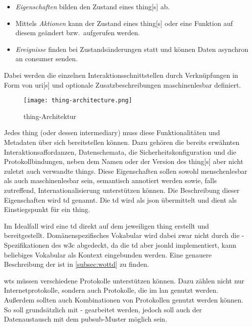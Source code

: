 \begin{itemize}
  \item \emph{Eigenschaften} bilden den Zustand eines \gls{thing}[s] ab.
  \item Mittels \emph{Aktionen} kann der Zustand eines \gls{thing}[s] oder eine Funktion auf diesem geändert bzw.\ aufgerufen werden. %
  \item \emph{Ereignisse} finden bei Zustandsänderungen statt und können Daten asynchron an \gls{consumer} senden.
\end{itemize}

Dabei werden die einzelnen Interaktionsschnittstellen durch Verknüpfungen in Form von \gls{uri}[s] und optionale Zusatzbeschreibungen maschinenlesbar definiert.

\begin{figure}[H]
  \centering
  \texttt{[image: thing-architecture.png]}
  \caption{\gls{thing}-Architektur}\label{fig:td_thing_architecture}
\end{figure}


Jedes \gls{thing} (oder dessen \gls{intermediary}) muss diese Funktionalitäten und Metadaten über sich bereitstellen können. Dazu gehören die bereits erwähnten Interaktionsaffordanzen, Datenschemata, die Sicherheitskonfiguration und die Protokollbindungen, neben dem Namen oder der Version des \gls{thing}[s] aber nicht zuletzt auch verwandte \glspl{thing}. Diese Eigenschaften sollen sowohl menschenlesbar als auch maschinenlesbar sein, semantisch annotiert werden sowie, falls zutreffend, Internationalisierung unterstützen können. Die Beschreibung dieser Eigenschaften wird \gls{td} genannt. Die \gls{td} wird als \gls{json} übermittelt und dient als Einstiegspunkt für ein \gls{thing}.

Im Idealfall wird eine \gls{td} direkt auf dem jeweiligen \gls{thing} erstellt und bereitgestellt. Domänenspezifisches Vokabular wird dabei zwar nicht durch die -Spezifikationen des \gls{w3c} abgedeckt, da die \gls{td} aber \gls{jsonld} implementiert, kann beliebiges Vokabular als Kontext eingebunden werden. Eine genauere Beschreibung der  ist in \autoref{subsec:wottd} zu finden.


\Glspl{wt} müssen verschiedene Protokolle unterstützen können. Dazu zählen nicht nur Internetprotokolle, sondern auch Protokolle, die im \gls{lan} genutzt werden. Außerdem sollten auch Kombinationen von Protokollen genutzt werden können. So soll grundsätzlich mit - gearbeitet werden, jedoch soll auch der Datenaustausch mit dem \gls{pubsub}-Muster möglich sein.

